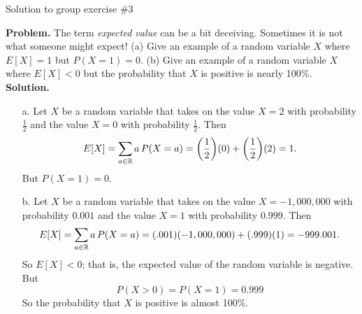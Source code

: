 \documentclass[10pt]{beamer}
\begin{document}
\begin{frame}{Solution to group exercise \#3}
\footnotesize

\textbf{Problem.} The term \textit{expected value} can be a bit deceiving. Sometimes it is not what someone might expect! (a) Give an example of a random variable $X$ where $E[X]=1$ but $P(X=1)=0$.  (b) Give an example of a random variable $X$ where $E[X]<0$ but the probability that $X$ is positive is nearly 100\%.
\vfill 
\textbf{Solution.}
\begin{itemize}
\item[a.] Let $X$ be a random variable that takes on the value $X=2$ with probability $\frac{1}{2}$ and the value $X=0$ with probability $\frac{1}{2}$. Then
\[ E[X] = \sum_{a \in \mathbb{R}} a \, P(X=a) = \bigg(\frac{1}{2} \bigg)(0) + \bigg(\frac{1}{2} \bigg)(2) = 1. \]
But $P(X=1)=0$.
\item[b.] Let $X$ be a random variable that takes on the value $X= -1,000,000$ with probability $0.001$ and the value $X=1$ with probability $0.999$.
Then 
\[ E[X] = \sum_{a \in \mathbb{R}} a \, P(X=a) = (.001)(-1,000,000) + (.999)(1) = -999.001. \]
So $E[X]<0$; that is, the expected value  of the random variable is negative. But 
\[P(X>0)=P(X=1)= 0.999\]
So the probability that $X$ is positive is almost 100\%.
\end{itemize}
	
\end{frame}
\end{document}

